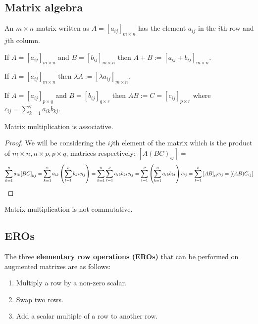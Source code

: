 \documentclass[../Year1.tex]{subfiles}
\begin{document}
\subsection{Matrix algebra}
\begin{definition}
    An $m\times n$ matrix written as $A = [a_{ij}]_{m\times n}$ has the element $a_{ij}$ in the $i$th row and $j$th column.
\end{definition}

\begin{definition}
    If $A = [a_{ij}]_{m\times n}$ and $B = [b_{ij}]_{m\times n}$ then $A+B := [a_{ij} + b_{ij}]_{m\times n}$.
\end{definition}

\begin{definition}
    If $A = [a_{ij}]_{m\times n}$ then $\lambda A := [\lambda a_{ij}]_{m\times n}$.
\end{definition}

\begin{definition}
    If $A = [a_{ij}]_{p\times q}$ and $B = [b_{ij}]_{q\times r}$ then $AB := C = [c_{ij}]_{p\times r}$ where $c_{ij} = \sum\limits_{k=1}^qa_{ik}b_{kj}$.
\end{definition}

\begin{theorem}
    Matrix multiplication is associative.
    \begin{proof}
        We will be considering the $ij$th element of the matrix which is the product of $m\times n, n\times p,p\times q$, matrices respectively: $[A{(BC)}_{ij}]=$\vspace{-10pt}\[
            \sum_{k=1}^n a_{ik}{[BC]}_{kj} = \sum_{k=1}^n a_{ik}\br{\sum_{t=1}^p b_{kt}c_{tj}} = \sum_{k=1}^n\sum_{t=1}^p a_{ik}b_{kt}c_{tj} 
            = \sum_{t=1}^p\br{\sum_{k=1}^n a_{ik}b_{kt}}c_{tj} = \sum_{t=1}^p{[AB]}_{it}c_{tj}=[(AB)C_{ij}]
        \]\vspace{-10pt}
    \end{proof}
\end{theorem}

\begin{remark}
    Matrix multiplication is not commutative.
\end{remark}

\subsection{EROs}
\begin{definition}
    The three \textbf{elementary row operations (EROs)} that can be performed on augmented matrixes are as follows:
    \begin{enumerate}
        \item Multiply a row by a non-zero scalar.
        \item Swap two rows.
        \item Add a scalar multiple of a row to another row.
    \end{enumerate}
\end{definition}
\end{document}
